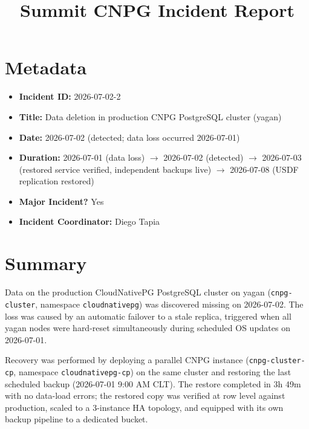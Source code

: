 \documentclass[PMO,authoryear,toc]{lsstdoc}
\title{Summit CNPG Incident Report}
\date{\vcsDate}
\begin{document}
\maketitle


\section{Metadata}

\begin{itemize}
  \item \textbf{Incident ID:} 2026-07-02-2
  \item \textbf{Title:} Data deletion in production CNPG PostgreSQL cluster
        (yagan)
  \item \textbf{Date:} 2026-07-02 (detected; data loss occurred 2026-07-01)
  \item \textbf{Duration:} 2026-07-01 (data loss) $\rightarrow$ 2026-07-02
        (detected) $\rightarrow$ 2026-07-03 (restored service verified,
        independent backups live) $\rightarrow$ 2026-07-08 (USDF replication
        restored)
  \item \textbf{Major Incident?} Yes
  \item \textbf{Incident Coordinator:} Diego Tapia
\end{itemize}

\section{Summary}

Data on the production CloudNativePG PostgreSQL cluster on yagan
(\texttt{cnpg-cluster}, namespace \texttt{cloudnativepg}) was discovered
missing on 2026-07-02. The loss was caused by an automatic failover to a stale
replica, triggered when all yagan nodes were hard-reset simultaneously during
scheduled OS updates on 2026-07-01.

Recovery was performed by deploying a parallel CNPG instance
(\texttt{cnpg-cluster-cp}, namespace \texttt{cloudnativepg-cp}) on the same
cluster and restoring the last scheduled backup (2026-07-01 9:00 AM CLT). The
restore completed in 3h 49m with no data-load errors; the restored copy was
verified at row level against production, scaled to a 3-instance HA topology,
and equipped with its own backup pipeline to a dedicated bucket.
\end{document}
